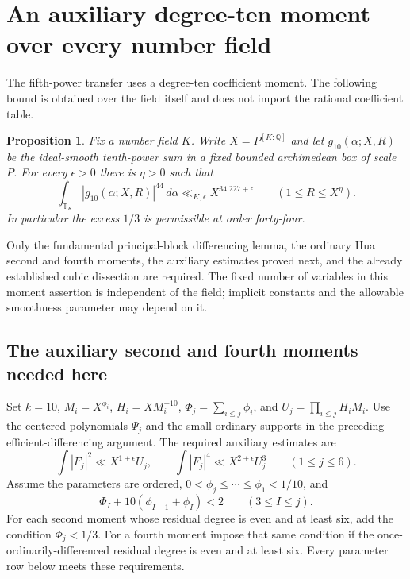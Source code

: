 \documentclass[11pt,reqno]{amsart}
\numberwithin{equation}{section}
\newtheorem{proposition}[theorem]{Proposition}
\theoremstyle{definition}
\begin{document}
\section{An auxiliary degree-ten moment over every number field}
\label{sec:tenth-moment}

The fifth-power transfer uses a degree-ten coefficient moment.  The following
bound is obtained over the field itself and does not import the rational
coefficient table.
\begin{proposition}\label{prop:tenth44}
Fix a number field $K$.  Write $X=P^{[K:\mathbb Q]}$ and let
$g_{10}(\alpha;X,R)$ be the ideal-smooth tenth-power sum in a fixed bounded
archimedean box of scale $P$.  For every $\epsilon>0$ there is $\eta>0$ such that
\[
 \int_{\mathbb T_K}|g_{10}(\alpha;X,R)|^{44}\,d\alpha
             \ll_{K,\epsilon}X^{34.227+\epsilon}
       \qquad(1\le R\le X^\eta).
\]
In particular the excess $1/3$ is permissible at order forty-four.
\end{proposition}

Only the fundamental principal-block differencing lemma, the ordinary Hua
second and fourth moments, the auxiliary estimates proved next, and the
already established cubic dissection are required.  The fixed number of
variables in this moment assertion is independent of the field; implicit
constants and the allowable smoothness parameter may depend on it.

\subsection{The auxiliary second and fourth moments needed here}

Set $k=10$, $M_i=X^{\phi_i}$, $H_i=XM_i^{-10}$,
$\Phi_j=\sum_{i\le j}\phi_i$, and $U_j=\prod_{i\le j}H_iM_i$.
Use the centered polynomials $\Psi_j$ and the small ordinary supports in the
preceding efficient-differencing argument.  The required auxiliary estimates are
\begin{equation}\label{eq:tenth-aux}
 \int |F_j|^2\ll X^{1+\epsilon}U_j,
 \qquad
 \int |F_j|^4\ll X^{2+\epsilon}U_j^3\qquad(1\le j\le6).
\end{equation}
Assume the parameters are ordered,
$0<\phi_j\le\cdots\le\phi_1<1/10$, and
\begin{equation}\label{eq:tenth-pairs}
 \Phi_I+10(\phi_{I-1}+\phi_I)<2\qquad(3\le I\le j).
\end{equation}
For each second moment whose residual degree is even and at least six,
add the condition $\Phi_j<1/3$.  For a fourth moment impose that same
condition if the once-ordinarily-differenced residual degree is even and
at least six.  Every parameter row below meets these requirements.
\end{document}
